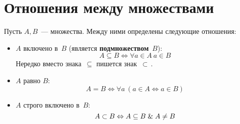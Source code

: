 \section{Отношения между множествами}
Пусть $A, B$~--- множества. Между ними определены следующие отношения:
\begin{itemize}
	\item $A$ включено в~$B$ (является \textbf{подмножеством}~$B$):
	\begin{equation*}
	A \subseteq B \Leftrightarrow \forall a \in A \ a \in B
	\end{equation*}
	Нередко вместо знака~$\subseteq$ пишется знак~$\subset$\,.
	
	\item $A$ равно $B$:
	\begin{equation*}
	A = B \Leftrightarrow \forall a \ (a \in A \Leftrightarrow a \in B)
	\end{equation*}
	
	\item $A$ строго включено в~$B$:
	\begin{equation*}
	A \subset B \Leftrightarrow A \subseteq B \mathrel{\&} A \neq B
	\end{equation*}
\end{itemize}